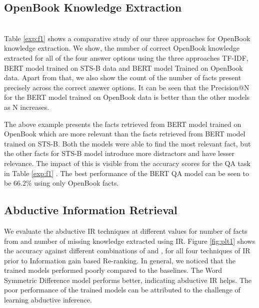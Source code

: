 \documentclass[11pt,a4paper]{article}
\begin{document}
\subsection{OpenBook Knowledge Extraction}
\noindent
{}\\

Table \ref{exp:f1} shows a comparative study of our three approaches for OpenBook knowledge extraction. We show, the number of correct OpenBook knowledge extracted for all of the four answer options  using the three approaches TF-IDF, BERT model trained on STS-B data and BERT model Trained on OpenBook data. Apart from that, we also show the count of the number of facts present precisely across the correct answer options. It can be seen that the Precision@N for the BERT model trained on OpenBook data is better than the other models as N increases. 

The above example presents the facts retrieved from BERT model trained on OpenBook which  are more relevant than the facts retrieved from BERT model trained on STS-B.  Both the models were able to find the most relevant fact, but the other facts for STS-B model introduce more distractors and have lesser relevance. The impact of this is visible  from the accuracy scores for the QA task in Table \ref{exp:f1} . The best performance of the BERT QA model can be seen to be 66.2\% using only OpenBook facts.


\subsection{Abductive Information Retrieval}
We evaluate the abductive IR techniques at different values for number of facts from  and number of missing knowledge  extracted using IR. Figure \ref{fig:plt1} shows the accuracy against different combinations of  and  , for all four techniques of IR prior to Information gain based Re-ranking. In general, we noticed that the trained models performed poorly compared to the baselines. The Word Symmetric Difference  model performs better, indicating abductive IR helps. The poor performance of the trained models can be attributed to the challenge of learning abductive inference. 
\end{document}
